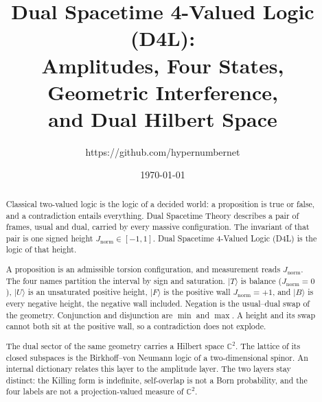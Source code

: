 \documentclass[a4paper]{article}
\title{Dual Spacetime 4-Valued Logic (D4L):\\
Amplitudes, Four States, Geometric Interference,\\
and Dual Hilbert Space}
\author{https://github.com/hypernumbernet}
\date{\today}
\theoremstyle{definition}
\newcommand{\Jnorm}{J_{\mathrm{norm}}}
\begin{document}
\maketitle

\begin{abstract}
Classical two-valued logic is the logic of a decided world: a
proposition is true or false, and a contradiction entails everything.
Dual Spacetime Theory describes a pair of frames, usual and dual,
carried by every massive configuration. The invariant of that pair is
one signed height \(\Jnorm\in[-1,1]\). Dual Spacetime 4-Valued Logic
(D4L) is the logic of that height.

A proposition is an admissible torsion configuration, and measurement
reads \(\Jnorm\). The four names partition the interval by sign and
saturation. \(\lvert T\rangle\) is balance (\(\Jnorm=0\)),
\(\lvert U\rangle\) is an unsaturated positive height,
\(\lvert F\rangle\) is the positive wall \(\Jnorm=+1\), and
\(\lvert B\rangle\) is every negative height, the negative wall
included. Negation is the usual--dual swap of the geometry.
Conjunction and disjunction are \(\min\) and \(\max\). A height and
its swap cannot both sit at the positive wall, so a contradiction
does not explode.

The dual sector of the same geometry carries a Hilbert space
\(\mathbb{C}^2\). The lattice of its closed subspaces is the
Birkhoff--von Neumann logic of a two-dimensional spinor. An internal
dictionary relates this layer to the amplitude layer. The two layers
stay distinct: the Killing form is indefinite, self-overlap is not a
Born probability, and the four labels are not a projection-valued
measure of \(\mathbb{C}^2\).


\end{abstract}
\end{document}
